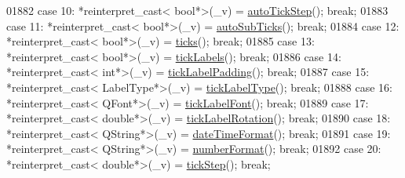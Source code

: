 \begin{DoxyCode}
01882         \textcolor{keywordflow}{case} 10: *\textcolor{keyword}{reinterpret\_cast<} \textcolor{keywordtype}{bool}*\textcolor{keyword}{>}(\_v) = \hyperlink{a00025_ae762920261b0c24beb56b893e5a2471d}{autoTickStep}(); \textcolor{keywordflow}{break};
01883         \textcolor{keywordflow}{case} 11: *\textcolor{keyword}{reinterpret\_cast<} \textcolor{keywordtype}{bool}*\textcolor{keyword}{>}(\_v) = \hyperlink{a00025_ab9a950e16f373fe5c4b79078bb97c171}{autoSubTicks}(); \textcolor{keywordflow}{break};
01884         \textcolor{keywordflow}{case} 12: *\textcolor{keyword}{reinterpret\_cast<} \textcolor{keywordtype}{bool}*\textcolor{keyword}{>}(\_v) = \hyperlink{a00025_a61c504ec7c5bed9a63edf45345995d10}{ticks}(); \textcolor{keywordflow}{break};
01885         \textcolor{keywordflow}{case} 13: *\textcolor{keyword}{reinterpret\_cast<} \textcolor{keywordtype}{bool}*\textcolor{keyword}{>}(\_v) = \hyperlink{a00025_a9a78fcccd98a73d37b3d991df7b6ef1d}{tickLabels}(); \textcolor{keywordflow}{break};
01886         \textcolor{keywordflow}{case} 14: *\textcolor{keyword}{reinterpret\_cast<} \textcolor{keywordtype}{int}*\textcolor{keyword}{>}(\_v) = \hyperlink{a00025_af7bc2fac3f95949ecd0204d20dc1463b}{tickLabelPadding}(); \textcolor{keywordflow}{break};
01887         \textcolor{keywordflow}{case} 15: *\textcolor{keyword}{reinterpret\_cast<} LabelType*\textcolor{keyword}{>}(\_v) = \hyperlink{a00025_a8a6f58a1ce12cfc4fadd379167668e8d}{tickLabelType}(); \textcolor{keywordflow}{break};
01888         \textcolor{keywordflow}{case} 16: *\textcolor{keyword}{reinterpret\_cast<} QFont*\textcolor{keyword}{>}(\_v) = \hyperlink{a00025_af6d7ad17f3398b114a413f7a3dc5ef9d}{tickLabelFont}(); \textcolor{keywordflow}{break};
01889         \textcolor{keywordflow}{case} 17: *\textcolor{keyword}{reinterpret\_cast<} \textcolor{keywordtype}{double}*\textcolor{keyword}{>}(\_v) = \hyperlink{a00025_ab9199d72b8c4c06cc6c9b928c30d00d2}{tickLabelRotation}(); \textcolor{keywordflow}{break};
01890         \textcolor{keywordflow}{case} 18: *\textcolor{keyword}{reinterpret\_cast<} QString*\textcolor{keyword}{>}(\_v) = \hyperlink{a00025_a132b54ae184a12ed24c9af24f53dc70b}{dateTimeFormat}(); \textcolor{keywordflow}{break};
01891         \textcolor{keywordflow}{case} 19: *\textcolor{keyword}{reinterpret\_cast<} QString*\textcolor{keyword}{>}(\_v) = \hyperlink{a00025_ae6729b40845b29ffa5a440aa53cec215}{numberFormat}(); \textcolor{keywordflow}{break};
01892         \textcolor{keywordflow}{case} 20: *\textcolor{keyword}{reinterpret\_cast<} \textcolor{keywordtype}{double}*\textcolor{keyword}{>}(\_v) = \hyperlink{a00025_a0e6120d24266544441ab691f316a1b03}{tickStep}(); \textcolor{keywordflow}{break};

\end{DoxyCode}
